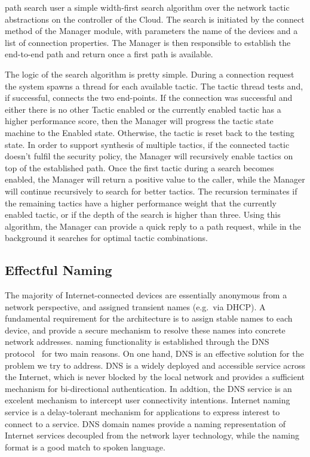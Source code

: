 \signpost path search  user a simple width-first search algorithm over the
network tactic abstractions on the controller of the \signpost Cloud. The search
is initiated by the connect method of the Manager module, with parameters the
name of the devices and a list of connection properties. The Manager is then
responsible to establish the end-to-end path and return once a first path is
available. 

The logic of the search algorithm is pretty simple. During a connection request
the system spawns a thread for each available tactic. The tactic thread tests
and, if successful, connects the two end-points. If the connection was
successful and either there is no other Tactic enabled or the currently enabled
tactic has a higher performance score, then the Manager will progress the tactic
state machine to the Enabled state. Otherwise, the tactic is reset back to the
testing state. In order to support synthesis of multiple tactics, if the
connected tactic doesn't fulfil the security policy, the Manager will
recursively enable tactics on top of the established path. Once the first tactic
during a search becomes enabled, the Manager will return a positive value to the
caller, while the Manager will continue recursively to search for better
tactics.  The recursion terminates if the remaining tactics have a higher
performance weight that the currently enabled tactic, or if the depth of the
search is higher than three. Using this algorithm, the Manager can provide a
quick reply to a path request, while in the background it searches for optimal
tactic combinations. 

\subsection{Effectful Naming} \label{signpost-naming}

The majority of Internet-connected devices are essentially anonymous from a
network perspective, and assigned transient names (e.g.~via DHCP). A fundamental
requirement for the \signpost architecture is to assign stable names to each
device, and provide a secure mechanism to resolve these names into concrete
network addresses.  \signpost naming functionality is established through the
DNS protocol~\cite{RFC1034} for two main reasons. On one hand, DNS is an
effective solution for the problem we try to address. DNS is a widely deployed
and accessible service across the Internet, which is never blocked by the local
network and provides a sufficient mechanism for bi-directional authentication.
In addtion, the DNS service is an excelent mechanism to intercept user
connectivity intentions. Internet naming service is a delay-tolerant mechanism for
applications to express interest to connect to a service. DNS domain names
provide a naming representation of Internet services decoupled from the network
layer technology, while the naming format is a good match to spoken language. 


